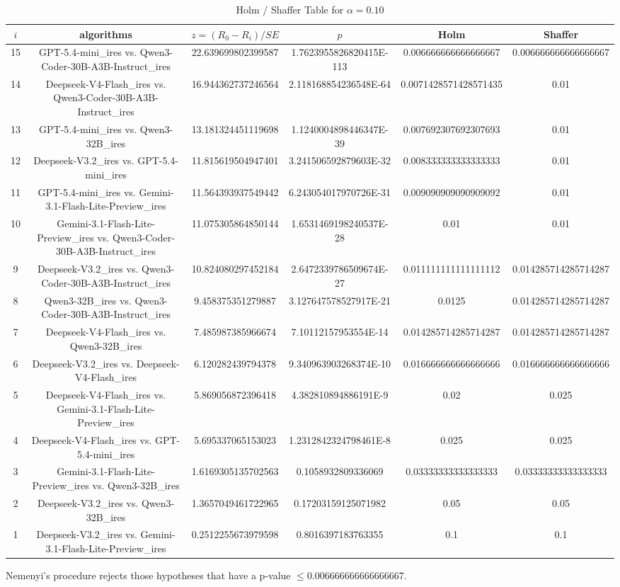 \documentclass[a4paper,10pt]{article}
\begin{document}
\begin{landscape}
\begin{table}[!htp]
\centering\tiny
\caption{Holm / Shaffer Table for $\alpha=0.10$}
\begin{tabular}{cccccc}
$i$&algorithms&$z=(R_0 - R_i)/SE$&$p$&Holm&Shaffer\\
\hline
15&GPT-5.4-mini_ires vs. Qwen3-Coder-30B-A3B-Instruct_ires&22.639699802399587&1.7623955826820415E-113&0.006666666666666667&0.006666666666666667\\14&Deepseek-V4-Flash_ires vs. Qwen3-Coder-30B-A3B-Instruct_ires&16.944362737246564&2.118168854236548E-64&0.0071428571428571435&0.01\\13&GPT-5.4-mini_ires vs. Qwen3-32B_ires&13.181324451119698&1.1240004898446347E-39&0.007692307692307693&0.01\\12&Deepseek-V3.2_ires vs. GPT-5.4-mini_ires&11.815619504947401&3.241506592879603E-32&0.008333333333333333&0.01\\11&GPT-5.4-mini_ires vs. Gemini-3.1-Flash-Lite-Preview_ires&11.564393937549442&6.243054017970726E-31&0.009090909090909092&0.01\\10&Gemini-3.1-Flash-Lite-Preview_ires vs. Qwen3-Coder-30B-A3B-Instruct_ires&11.075305864850144&1.6531469198240537E-28&0.01&0.01\\9&Deepseek-V3.2_ires vs. Qwen3-Coder-30B-A3B-Instruct_ires&10.824080297452184&2.6472339786509674E-27&0.011111111111111112&0.014285714285714287\\8&Qwen3-32B_ires vs. Qwen3-Coder-30B-A3B-Instruct_ires&9.458375351279887&3.127647578527917E-21&0.0125&0.014285714285714287\\7&Deepseek-V4-Flash_ires vs. Qwen3-32B_ires&7.485987385966674&7.10112157953554E-14&0.014285714285714287&0.014285714285714287\\6&Deepseek-V3.2_ires vs. Deepseek-V4-Flash_ires&6.120282439794378&9.340963903268374E-10&0.016666666666666666&0.016666666666666666\\5&Deepseek-V4-Flash_ires vs. Gemini-3.1-Flash-Lite-Preview_ires&5.869056872396418&4.382810894886191E-9&0.02&0.025\\4&Deepseek-V4-Flash_ires vs. GPT-5.4-mini_ires&5.695337065153023&1.2312842324798461E-8&0.025&0.025\\3&Gemini-3.1-Flash-Lite-Preview_ires vs. Qwen3-32B_ires&1.6169305135702563&0.1058932809336069&0.03333333333333333&0.03333333333333333\\2&Deepseek-V3.2_ires vs. Qwen3-32B_ires&1.3657049461722965&0.17203159125071982&0.05&0.05\\1&Deepseek-V3.2_ires vs. Gemini-3.1-Flash-Lite-Preview_ires&0.2512255673979598&0.8016397183763355&0.1&0.1\\\hline
\end{tabular}
\end{table}
Nemenyi's procedure rejects those hypotheses that have a p-value $\le0.006666666666666667$.



\end{landscape}
\end{document}
